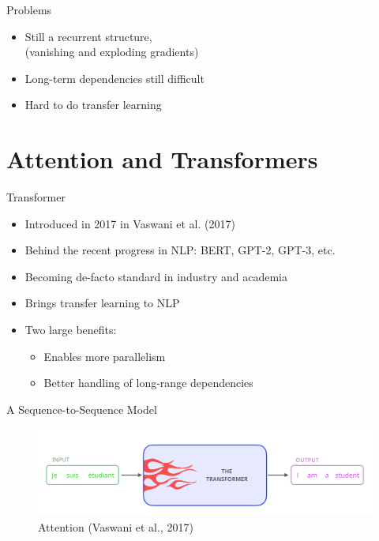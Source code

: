 \documentclass[10pt]{beamer}
\begin{document}
\begin{frame}{Problems}

\begin{itemize}
\item Still a {\color{uured} recurrent structure},\\(vanishing and exploding gradients)
\item Long-term dependencies still difficult
\item Hard to do {\color{uured} transfer learning}
\end{itemize}


\end{frame}


\section{Attention and Transformers}

\begin{frame}{Transformer}

\begin{itemize}
\item Introduced in 2017 in Vaswani et al. (2017)
\item Behind the recent progress in NLP: BERT, GPT-2, GPT-3, etc.
\pause
\item Becoming de-facto standard in industry and academia
\pause
\item Brings {\color{uured} transfer learning} to NLP
\pause
\item Two large benefits:
\begin{itemize}
\item Enables more {\color{uured} parallelism}
\item Better handling of {\color{uured} long-range dependencies}
\end{itemize}
\end{itemize}

\end{frame}



\begin{frame}{A Sequence-to-Sequence Model}

\begin{figure}[h]
\centering
\includegraphics[width=1\textwidth]{fig/alammar_the_transformer_3.png}
\caption{Attention (Vaswani et al., 2017)}
\end{figure}

\end{frame}
\end{document}
